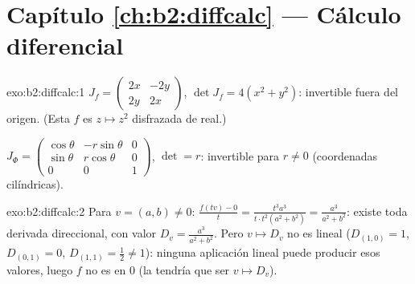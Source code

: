 \section*{Capítulo \ref{ch:b2:diffcalc} --- Cálculo diferencial}

\begin{solution}{exo:b2:diffcalc:1}
$J_f = \begin{pmatrix} 2x & -2y\\ 2y & 2x\end{pmatrix}$, $\det J_f =
4(x^2 + y^2)$: invertible fuera del origen. (Esta $f$ es $z \mapsto
z^2$ disfrazada de real.)

$J_\Phi = \begin{pmatrix} \cos\theta & -r\sin\theta & 0\\ \sin\theta
& r\cos\theta & 0\\ 0 & 0 & 1\end{pmatrix}$, $\det = r$: invertible
para $r \neq 0$ (coordenadas cilíndricas).
\end{solution}

\begin{solution}{exo:b2:diffcalc:2}
Para $v = (a, b) \neq 0$: $\frac{f(tv) - 0}{t} = \frac{t^3a^3}{t\cdot
t^2(a^2+b^2)} = \frac{a^3}{a^2 + b^2}$: existe toda derivada
direccional, con valor $D_v = \frac{a^3}{a^2+b^2}$. Pero $v \mapsto
D_v$ no es lineal ($D_{(1,0)} = 1$, $D_{(0,1)} = 0$, $D_{(1,1)} =
\frac12 \neq 1$): ninguna aplicación lineal puede producir esos
valores, luego $f$ no es  en $0$ (la 
tendría que ser $v \mapsto D_v$).
\end{solution}

